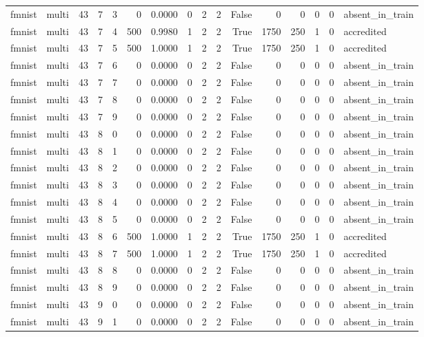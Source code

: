\begin{tabular}{llrrrrrrrrrrrrrl}
fmnist & multi & 43 & 7 & 3 & 0 & 0.0000 & 0 & 2 & 2 & False & 0 & 0 & 0 & 0 & absent\_in\_train \\
fmnist & multi & 43 & 7 & 4 & 500 & 0.9980 & 1 & 2 & 2 & True & 1750 & 250 & 1 & 0 & accredited \\
fmnist & multi & 43 & 7 & 5 & 500 & 1.0000 & 1 & 2 & 2 & True & 1750 & 250 & 1 & 0 & accredited \\
fmnist & multi & 43 & 7 & 6 & 0 & 0.0000 & 0 & 2 & 2 & False & 0 & 0 & 0 & 0 & absent\_in\_train \\
fmnist & multi & 43 & 7 & 7 & 0 & 0.0000 & 0 & 2 & 2 & False & 0 & 0 & 0 & 0 & absent\_in\_train \\
fmnist & multi & 43 & 7 & 8 & 0 & 0.0000 & 0 & 2 & 2 & False & 0 & 0 & 0 & 0 & absent\_in\_train \\
fmnist & multi & 43 & 7 & 9 & 0 & 0.0000 & 0 & 2 & 2 & False & 0 & 0 & 0 & 0 & absent\_in\_train \\
fmnist & multi & 43 & 8 & 0 & 0 & 0.0000 & 0 & 2 & 2 & False & 0 & 0 & 0 & 0 & absent\_in\_train \\
fmnist & multi & 43 & 8 & 1 & 0 & 0.0000 & 0 & 2 & 2 & False & 0 & 0 & 0 & 0 & absent\_in\_train \\
fmnist & multi & 43 & 8 & 2 & 0 & 0.0000 & 0 & 2 & 2 & False & 0 & 0 & 0 & 0 & absent\_in\_train \\
fmnist & multi & 43 & 8 & 3 & 0 & 0.0000 & 0 & 2 & 2 & False & 0 & 0 & 0 & 0 & absent\_in\_train \\
fmnist & multi & 43 & 8 & 4 & 0 & 0.0000 & 0 & 2 & 2 & False & 0 & 0 & 0 & 0 & absent\_in\_train \\
fmnist & multi & 43 & 8 & 5 & 0 & 0.0000 & 0 & 2 & 2 & False & 0 & 0 & 0 & 0 & absent\_in\_train \\
fmnist & multi & 43 & 8 & 6 & 500 & 1.0000 & 1 & 2 & 2 & True & 1750 & 250 & 1 & 0 & accredited \\
fmnist & multi & 43 & 8 & 7 & 500 & 1.0000 & 1 & 2 & 2 & True & 1750 & 250 & 1 & 0 & accredited \\
fmnist & multi & 43 & 8 & 8 & 0 & 0.0000 & 0 & 2 & 2 & False & 0 & 0 & 0 & 0 & absent\_in\_train \\
fmnist & multi & 43 & 8 & 9 & 0 & 0.0000 & 0 & 2 & 2 & False & 0 & 0 & 0 & 0 & absent\_in\_train \\
fmnist & multi & 43 & 9 & 0 & 0 & 0.0000 & 0 & 2 & 2 & False & 0 & 0 & 0 & 0 & absent\_in\_train \\
fmnist & multi & 43 & 9 & 1 & 0 & 0.0000 & 0 & 2 & 2 & False & 0 & 0 & 0 & 0 & absent\_in\_train \\

\end{tabular}
